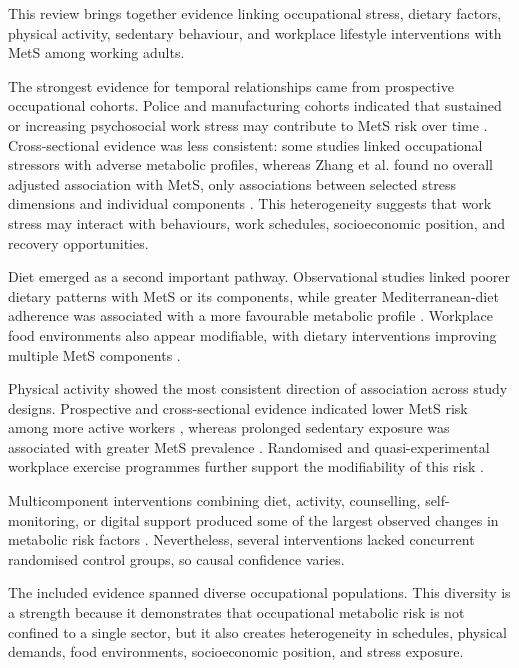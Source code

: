 \documentclass[11pt]{article}
\begin{document}
This review brings together evidence linking occupational stress, dietary factors, physical activity, sedentary behaviour, and workplace lifestyle interventions with MetS among working adults.

The strongest evidence for temporal relationships came from prospective occupational cohorts. Police and manufacturing cohorts indicated that sustained or increasing psychosocial work stress may contribute to MetS risk over time \citep{Garbarino2015,Yamaguchi2018}. Cross-sectional evidence was less consistent: some studies linked occupational stressors with adverse metabolic profiles, whereas Zhang et al. found no overall adjusted association with MetS, only associations between selected stress dimensions and individual components \citep{Zhang2024}. This heterogeneity suggests that work stress may interact with behaviours, work schedules, socioeconomic position, and recovery opportunities.

Diet emerged as a second important pathway. Observational studies linked poorer dietary patterns with MetS or its components, while greater Mediterranean-diet adherence was associated with a more favourable metabolic profile \citep{Sharifi2025,ReinosoBarbero2026}. Workplace food environments also appear modifiable, with dietary interventions improving multiple MetS components \citep{Kim2016Dietary,Ma2025}.

Physical activity showed the most consistent direction of association across study designs. Prospective and cross-sectional evidence indicated lower MetS risk among more active workers \citep{Kuwahara2016,Browne2017,Huang2017Taiwan}, whereas prolonged sedentary exposure was associated with greater MetS prevalence \citep{Motuma2020}. Randomised and quasi-experimental workplace exercise programmes further support the modifiability of this risk \citep{Haufe2019,Choi2017,Fang2019,So2025}.

Multicomponent interventions combining diet, activity, counselling, self-monitoring, or digital support produced some of the largest observed changes in metabolic risk factors \citep{Earnest2015,Ryu2017,Bogale2025}. Nevertheless, several interventions lacked concurrent randomised control groups, so causal confidence varies.

The included evidence spanned diverse occupational populations. This diversity is a strength because it demonstrates that occupational metabolic risk is not confined to a single sector, but it also creates heterogeneity in schedules, physical demands, food environments, socioeconomic position, and stress exposure.
\end{document}
